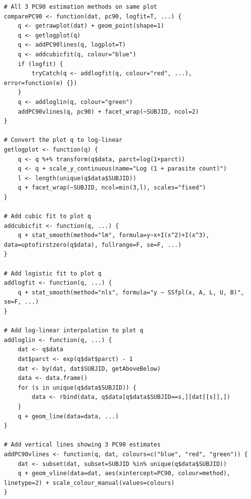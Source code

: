 \begin{lstlisting}[float=h,caption=Plot all 3 PC90 methods on same plot,label=R:comparePC90]
# All 3 PC90 estimation methods on same plot
comparePC90 <- function(dat, pc90, logfit=T, ...) {
	q <- getrawplot(dat) + geom_point(shape=1)
	q <- getlogplot(q)
	q <- addPC90lines(q, logplot=T)
	q <- addcubicfit(q, colour="blue")
	if (logfit) {
		tryCatch(q <- addlogfit(q, colour="red", ...), error=function(e) {})
	}
	q <- addloglin(q, colour="green")
	addPC90vlines(q, pc90) + facet_wrap(~SUBJID, ncol=2)
}

# Convert the plot q to log-linear
getlogplot <- function(q) {
	q <- q %+% transform(q$data, parct=log(1+parct))
	q <- q + scale_y_continuous(name="Log (1 + parasite count)")
	l <- length(unique(q$data$SUBJID))
	q + facet_wrap(~SUBJID, ncol=min(3,l), scales="fixed")
}

# Add cubic fit to plot q
addcubicfit <- function(q, ...) {
	q + stat_smooth(method="lm", formula=y~x+I(x^2)+I(x^3), data=uptofirstzero(q$data), fullrange=F, se=F, ...) 
}

# Add logistic fit to plot q
addlogfit <- function(q, ...) {
	q + stat_smooth(method="nls", formula="y ~ SSfpl(x, A, L, U, B)", se=F, ...)
}

# Add log-linear interpolation to plot q
addloglin <- function(q, ...) {
	dat <- q$data
	dat$parct <- exp(q$dat$parct) - 1
	dat <- by(dat, dat$SUBJID, getAboveBelow)
	data <- data.frame()
	for (s in unique(q$data$SUBJID)) {
		data <- rbind(data, q$data[q$data$SUBJID==s,][dat[[s]],])
	}
	q + geom_line(data=data, ...)
}

# Add vertical lines showing 3 PC90 estimates
addPC90vlines <- function(q, dat, colours=c("blue", "red", "green")) {
	dat <- subset(dat, subset=SUBJID %in% unique(q$data$SUBJID))
	q + geom_vline(data=dat, aes(xintercept=PC90, colour=method), linetype=2) + scale_colour_manual(values=colours)
}
\end{lstlisting}

